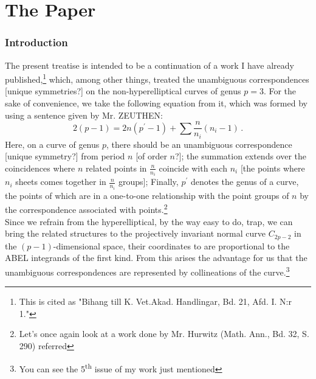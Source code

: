 \documentclass[leqno]{article}
\begin{document}
\part*{The Paper}
\section*{Introduction}
The present treatise is intended to be a continuation of a work I have already published,\footnote{This is cited as "Bihang till K. Vet.Akad. Handlingar, Bd. 21, Afd. I. N:r 1."} which, among other things, treated the unambiguous correspondences [unique symmetries?] on the non-hyperelliptical curves of genus $p = 3$. 
For the sake of convenience, we take the following equation from it, which was formed by using a sentence given by Mr. ZEUTHEN:
\begin{equation}\label{eq: A}
2(p-1) = 2n(p^\prime-1) + \sum \frac{n}{n_i}(n_i-1) \, . \tag{A}
\end{equation}
Here, on a curve of genus $p$, there should be an unambiguous correspondence [unique symmetry?] from period $n$ [of order $n$?]; the summation extends over the coincidences where $n$ related points in $\frac{n}{n_i}$ coincide with each $n_i$ [the points where $n_i$ sheets comes together in $\frac{n}{n_i}$ groups]; Finally, $p^\prime$ denotes the genus of a curve, the points of which are in a one-to-one relationship with the point groups of $n$ by the correspondence associated with points.\footnote{Let’s once again look at a work done by Mr. Hurwitz (Math. Ann., Bd. 32, S. 290) referred} \\
Since we refrain from the hyperelliptical, by the way easy to do, trap, we can bring the related structures to the projectively invariant normal curve $ C_ {2p-2} $ in the $ (p-1) $-dimensional space, their coordinates to are proportional to the ABEL integrands of the first kind. From this arises the advantage for us that the unambiguous correspondences are represented by collineations of the curve.\footnote{You can see the 5\textsuperscript{th} issue of my work just mentioned}
\end{document}
